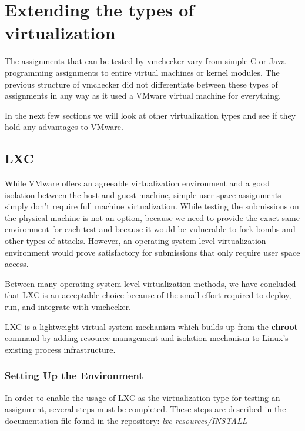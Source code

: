\chapter{Extending the types of virtualization}
\label{chapter:virt-types}

The assignments that can be tested by vmchecker vary from simple C or Java
programming assignments to entire virtual machines or kernel modules.
The previous structure of vmchecker did not differentiate between these types of
assignments in any way as it used a VMware virtual machine for everything.

In the next few sections we will look at other virtualization types and see if
they hold any advantages to VMware.

\section{LXC}
\label{sec:vmc-lxc}

While VMware offers an agreeable virtualization environment and a good isolation
between the host and guest machine, simple user space assignments simply don't 
require full machine virtualization. While testing the submissions on the 
physical machine is not an option, because we need to provide the exact same
environment for each test and because it would be vulnerable to fork-bombs and 
other types of attacks. However, an operating system-level virtualization 
environment would prove satisfactory for submissions that only require user space
access.

Between many operating system-level virtualization methods, we have concluded
that LXC is an acceptable choice because of the small effort required to 
deploy, run, and integrate with vmchecker.

LXC is a lightweight virtual system mechanism which builds up from the {\bf chroot}
command by adding resource management and isolation mechanism to Linux's 
existing process infrastructure.

\subsection {Setting Up the Environment}
\label{sub-sec:vmc-lxc-env}

In order to enable the usage of LXC as the virtualization type for testing an 
assignment, several steps must be completed. These steps are described in the 
documentation file found in the repository: \textit{lxc-resources/INSTALL}

